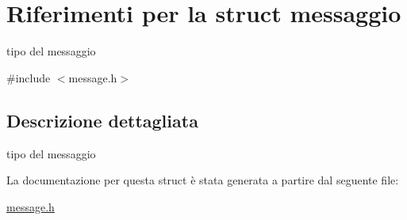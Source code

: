 \hypertarget{structmessaggio}{}\section{Riferimenti per la struct messaggio}
\label{structmessaggio}


tipo del messaggio  




{\ttfamily \#include $<$message.\+h$>$}



\subsection{Descrizione dettagliata}
tipo del messaggio 

La documentazione per questa struct è stata generata a partire dal seguente file\+:\begin{DoxyCompactItemize}
\item 
\hyperlink{message_8h}{message.\+h}\end{DoxyCompactItemize}
